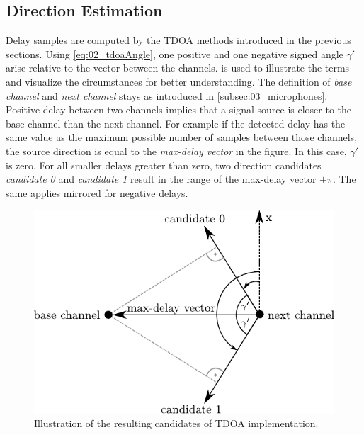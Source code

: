\subsection{Direction Estimation}
\label{subsec:03_directionCandidates}

Delay samples are computed by the \ac{TDOA} methods introduced in the previous
sections.
Using \cref{eq:02_tdoaAngle}, one positive and one negative signed angle $\gamma'$
arise relative to the vector between the channels.
 is used to illustrate the terms and visualize the
circumstances for better understanding.
The definition of \textit{base channel} and \textit{next channel} stays as introduced
in \cref{subsec:03_microphones}.
Positive delay between two channels implies that a signal source
is closer to the base channel than the next channel.
For example if the detected delay has the same value as the maximum possible number
of samples between those channels, the source direction is equal to the
\textit{max-delay vector} in the figure.
In this case, $\gamma'$ is zero.
For all smaller delays greater than zero, two direction candidates \textit{candidate 0}
and \textit{candidate 1} result in the range of the max-delay vector $\pm \pi$.
The same applies mirrored for negative delays.
 
\begin{figure}[ht]
	\centering
		\includegraphics[width=0.6\columnwidth]{figures/tdoa_code}
	\caption{Illustration of the resulting candidates of \ac{TDOA} implementation.}
	\label{fig:03_tdoaCode}
\end{figure}


